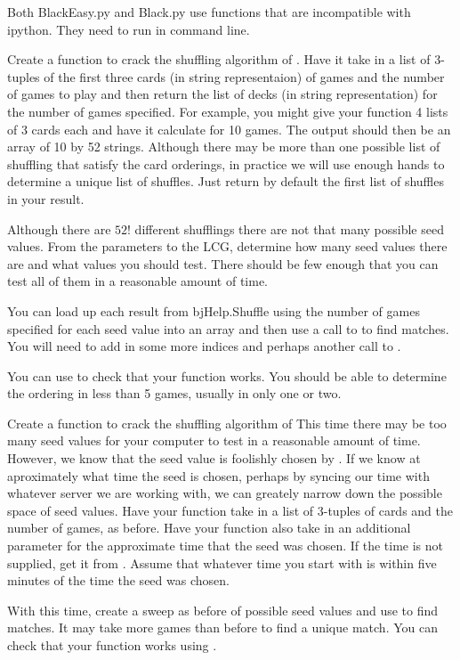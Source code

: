 \begin{warn}
Both BlackEasy.py and Black.py use functions that are incompatible with ipython. They need to run  in command line.
\end{warn}


\begin{problem}
Create a function to crack the shuffling algorithm of . 
Have it take in a list of 3-tuples of the first three cards (in string representaion) of games and the number of games to play and then return the list of decks (in string representation) for the number of games specified. 
For example, you might give your function 4 lists of 3 cards each and have it calculate for 10 games. 
The output should then be an array of 10 by 52 strings. 
Although there may be more than one possible list of shuffling that satisfy the card orderings, in practice we will use enough hands to determine a unique list of shuffles. Just return by default the first list of shuffles in your result.

Although there are $52!$ different shufflings there are not that many possible seed values. 
From the parameters to the LCG, determine how many seed values there are and what values you should test.
There should be few enough that you can test all of them in a reasonable amount of time.

You can load up each result from bjHelp.Shuffle using the number of games specified for each seed value into an array and then use a call to  to find matches.
You will need to add in some more indices and perhaps another call to .

You can use  to check that your function works. You should be able to determine the ordering in less than 5 games, usually in only one or two.
\end{problem}

\begin{problem}
Create a function to crack the shuffling algorithm of 
This time there may be too many seed values for your computer to test in a reasonable amount of time. 
However, we know that the seed value is foolishly chosen by .
If we know at aproximately what time the seed is chosen, perhaps by syncing our time with whatever server we are working with, we can greately narrow down the possible space of seed values.
Have your function take in a list of 3-tuples of cards and the number of games, as before.
Have your function also take in an additional parameter for the approximate time that the seed was chosen.
If the time is not supplied, get it from .
Assume that whatever time you start with is within five minutes of the time the seed was chosen.

With this time, create a sweep as before of possible seed values and use  to find matches.
It may take more games than before to find a unique match.
You can check that your function works using .
\end{problem}
